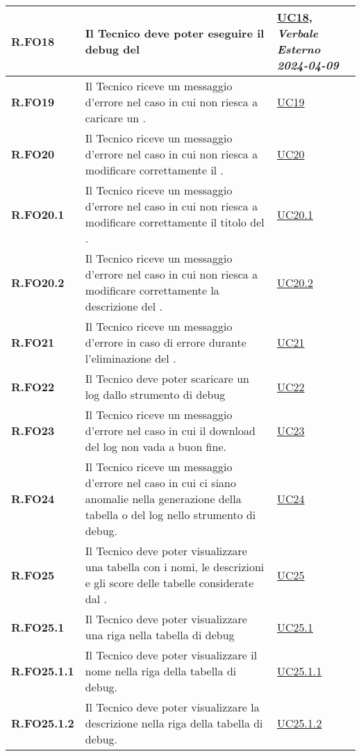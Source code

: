 \begin{longtable}{|P{3cm}|P{6,5cm}|>{\arraybackslash}P{4cm}|}
    \hline
    \textbf{R.FO18} & Il Tecnico deve poter eseguire il debug del  &  \hyperref[UC18]{UC18}, \emph{Verbale Esterno 2024-04-09}\\
    \hline
    \textbf{R.FO19} & Il Tecnico riceve un messaggio d'errore nel caso in cui non riesca a caricare un . & \hyperref[UC19]{UC19} \\
    \hline 
    \textbf{R.FO20} & Il Tecnico riceve un messaggio d'errore nel caso in cui non riesca a modificare correttamente il . & \hyperref[UC20]{UC20} \\
    \hline
    \textbf{R.FO20.1} & Il Tecnico riceve un messaggio d'errore nel caso in cui non riesca a modificare correttamente il titolo del . & \hyperref[UC20point1]{UC20.1} \\
    \hline
    \textbf{R.FO20.2} & Il Tecnico riceve un messaggio d'errore nel caso in cui non riesca a modificare correttamente la descrizione del . & \hyperref[UC20point2]{UC20.2} \\
    \hline
    \textbf{R.FO21} & Il Tecnico riceve un messaggio d'errore in caso di errore durante l'eliminazione del . &  \hyperref[21]{UC21}\\
    \hline
    \textbf{R.FO22} & Il Tecnico deve poter scaricare un log dallo strumento di debug &  \hyperref[UC22]{UC22}\\
    \hline
    \textbf{R.FO23} & Il Tecnico riceve un messaggio d'errore nel caso in cui il download del log non vada a buon fine. &  \hyperref[UC23]{UC23}\\
    \hline
    \textbf{R.FO24} & Il Tecnico riceve un messaggio d'errore nel caso in cui ci siano anomalie nella generazione della tabella o del log nello strumento di debug. &  \hyperref[UC24]{UC24}\\
    \hline
    \textbf{R.FO25} & Il Tecnico deve poter visualizzare una tabella con i nomi, le descrizioni e gli score delle tabelle considerate dal . &  \hyperref[UC25]{UC25}\\
    \hline
    \textbf{R.FO25.1} & Il Tecnico deve poter visualizzare una riga nella tabella di debug &  \hyperref[UC25point1]{UC25.1}\\
    \hline
    \textbf{R.FO25.1.1} & Il Tecnico deve poter visualizzare il nome nella riga della tabella di debug. &  \hyperref[UC25poin1point1]{UC25.1.1}\\
    \hline
    \textbf{R.FO25.1.2} & Il Tecnico deve poter visualizzare la descrizione nella riga della tabella di debug. &  \hyperref[UC25poin1point2]{UC25.1.2}\\

\end{longtable}
